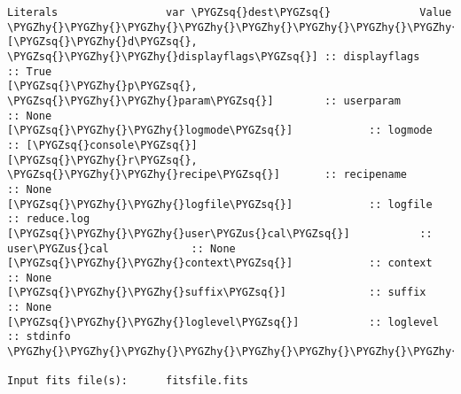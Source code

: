 \documentclass[letterpaper,10pt,english]{sphinxmanual}
\def\PYGZus{\char`\_}
\def\PYGZhy{\char`\-}
\def\PYGZsq{\char`\'}
\begin{document}
\begin{description}
\begin{Verbatim}[commandchars=\\\{\}]
Literals                 var \PYGZsq{}dest\PYGZsq{}              Value
\PYGZhy{}\PYGZhy{}\PYGZhy{}\PYGZhy{}\PYGZhy{}\PYGZhy{}\PYGZhy{}\PYGZhy{}\PYGZhy{}\PYGZhy{}\PYGZhy{}\PYGZhy{}\PYGZhy{}\PYGZhy{}\PYGZhy{}\PYGZhy{}\PYGZhy{}\PYGZhy{}\PYGZhy{}\PYGZhy{}\PYGZhy{}\PYGZhy{}\PYGZhy{}\PYGZhy{}\PYGZhy{}\PYGZhy{}\PYGZhy{}\PYGZhy{}\PYGZhy{}\PYGZhy{}\PYGZhy{}\PYGZhy{}\PYGZhy{}\PYGZhy{}\PYGZhy{}\PYGZhy{}\PYGZhy{}\PYGZhy{}\PYGZhy{}\PYGZhy{}\PYGZhy{}\PYGZhy{}\PYGZhy{}\PYGZhy{}\PYGZhy{}\PYGZhy{}\PYGZhy{}\PYGZhy{}\PYGZhy{}\PYGZhy{}\PYGZhy{}\PYGZhy{}\PYGZhy{}\PYGZhy{}\PYGZhy{}\PYGZhy{}\PYGZhy{}\PYGZhy{}\PYGZhy{}\PYGZhy{}\PYGZhy{}\PYGZhy{}\PYGZhy{}\PYGZhy{}\PYGZhy{}
[\PYGZsq{}\PYGZhy{}d\PYGZsq{}, \PYGZsq{}\PYGZhy{}\PYGZhy{}displayflags\PYGZsq{}] :: displayflags         :: True
[\PYGZsq{}\PYGZhy{}p\PYGZsq{}, \PYGZsq{}\PYGZhy{}\PYGZhy{}param\PYGZsq{}]        :: userparam            :: None
[\PYGZsq{}\PYGZhy{}\PYGZhy{}logmode\PYGZsq{}]            :: logmode              :: [\PYGZsq{}console\PYGZsq{}]
[\PYGZsq{}\PYGZhy{}r\PYGZsq{}, \PYGZsq{}\PYGZhy{}\PYGZhy{}recipe\PYGZsq{}]       :: recipename           :: None
[\PYGZsq{}\PYGZhy{}\PYGZhy{}logfile\PYGZsq{}]            :: logfile              :: reduce.log
[\PYGZsq{}\PYGZhy{}\PYGZhy{}user\PYGZus{}cal\PYGZsq{}]           :: user\PYGZus{}cal             :: None
[\PYGZsq{}\PYGZhy{}\PYGZhy{}context\PYGZsq{}]            :: context              :: None
[\PYGZsq{}\PYGZhy{}\PYGZhy{}suffix\PYGZsq{}]             :: suffix               :: None
[\PYGZsq{}\PYGZhy{}\PYGZhy{}loglevel\PYGZsq{}]           :: loglevel             :: stdinfo
\PYGZhy{}\PYGZhy{}\PYGZhy{}\PYGZhy{}\PYGZhy{}\PYGZhy{}\PYGZhy{}\PYGZhy{}\PYGZhy{}\PYGZhy{}\PYGZhy{}\PYGZhy{}\PYGZhy{}\PYGZhy{}\PYGZhy{}\PYGZhy{}\PYGZhy{}\PYGZhy{}\PYGZhy{}\PYGZhy{}\PYGZhy{}\PYGZhy{}\PYGZhy{}\PYGZhy{}\PYGZhy{}\PYGZhy{}\PYGZhy{}\PYGZhy{}\PYGZhy{}\PYGZhy{}\PYGZhy{}\PYGZhy{}\PYGZhy{}\PYGZhy{}\PYGZhy{}\PYGZhy{}\PYGZhy{}\PYGZhy{}\PYGZhy{}\PYGZhy{}\PYGZhy{}\PYGZhy{}\PYGZhy{}\PYGZhy{}\PYGZhy{}\PYGZhy{}\PYGZhy{}\PYGZhy{}\PYGZhy{}\PYGZhy{}\PYGZhy{}\PYGZhy{}\PYGZhy{}\PYGZhy{}\PYGZhy{}\PYGZhy{}\PYGZhy{}\PYGZhy{}\PYGZhy{}\PYGZhy{}\PYGZhy{}\PYGZhy{}\PYGZhy{}\PYGZhy{}\PYGZhy{}

Input fits file(s):      fitsfile.fits
\end{Verbatim}

\end{description}
\end{document}
